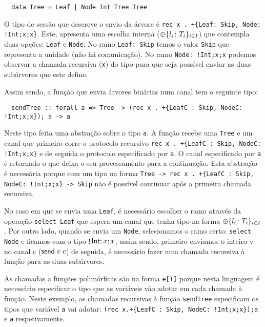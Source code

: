 \begin{lstlisting}
  data Tree = Leaf | Node Int Tree Tree
\end{lstlisting}

O tipo de sessão que descreve o envio da árvore é \lstinline"rec x . +{Leaf: Skip, Node: !Int;x;x}". Este, apresenta uma escolha interna ($\oplus\{l_i\colon T_i\}_{i\in I}$) que contempla duas opções: \lstinline"Leaf" e \lstinline"Node". No ramo \lstinline"Leaf: Skip" temos o valor \lstinline"Skip" que representa a unidade (não há comunicação). No ramo \lstinline"Node: !Int;x;x" podemos observar a chamada recursiva (\lstinline"x") do tipo para que seja possível enviar as duas subárvores que este define.

Assim sendo, a função que envia árvores binárias num canal tem o seguinte tipo:

\begin{lstlisting}
  sendTree :: forall a => Tree -> (rec x . +{LeafC : Skip, NodeC: !Int;x;x}); a -> a
\end{lstlisting}

Neste tipo feita uma abstração sobre o tipo \lstinline|a|. A função recebe uma \lstinline|Tree| e um canal que primeiro corre o protocolo recursivo \lstinline|rec x . +{LeafC : Skip, NodeC: !Int;x;x}| e de seguida o protocolo especificado por \lstinline|a|. O canal especificado por \lstinline|a| é retornado o que deixa o seu processamento para a continuação. Esta abstração é necessária porque com um tipo na forma \lstinline|Tree -> rec x . +{LeafC : Skip, NodeC: !Int;x;x} -> Skip| não é possível continuar após a primeira chamada recursiva.

No caso em que se envia uma \lstinline"Leaf", é necessário escolher o ramo através da operação \lstinline"select Leaf" que espera um canal que tenha tipo na forma $\oplus\{l_i\colon T_i\}_{i\in I}$.
Por outro lado, quando se envia um \lstinline"Node", selecionamos o ramo certo: \lstinline"select Node" e ficamos com o tipo $\mathop!\mathsf{Int};x;x$, assim sendo, primeiro enviamos o inteiro v no canal c ($\mathsf{send}\;v\; c$) de seguida, é necessário fazer uma chamada recursiva à função para as duas subárvores.

As chamadas a funções polimórficas são na forma \lstinline"e[T]" porque nesta linguagem é necessário especificar o tipo que as variáveis vão adotar em cada chamada à função. Neste exemplo, as chamadas recursivas à função \lstinline"sendTree" especificam os tipos que variável \lstinline"a" vai adotar: \lstinline|(rec x.+{LeafC : Skip, NodeC: !Int;x;x});a| e \lstinline|a| respetivamente.


